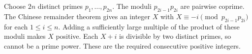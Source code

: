 Choose $2n$ distinct primes $p_1,\ldots,p_{2n}$. The moduli $p_{2i-1}p_{2i}$ are pairwise coprime. The Chinese remainder theorem gives an integer $X$ with $X\equiv-i\pmod{p_{2i-1}p_{2i}}$ for each $1\le i\le n$. Adding a sufficiently large multiple of the product of these moduli makes $X$ positive. Each $X+i$ is divisible by two distinct primes, so cannot be a prime power. These are the required consecutive positive integers.
